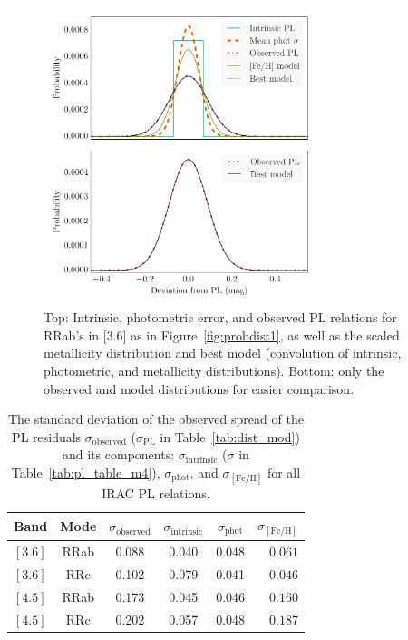 \begin{figure}
\begin{center}
\includegraphics[width=80mm]{reworked_fitting_code/final_plots/distributions_ab_3_gaussian.pdf}
\caption{Top: Intrinsic, photometric error, and observed PL relations for RRab's in [3.6] as in Figure~\ref{fig:probdist1}, as well as the scaled metallicity distribution and best model (convolution of intrinsic, photometric, and metallicity distributions). Bottom: only the observed and model distributions for easier comparison.}
\label{fig:probdist2}
\end{center}
\end{figure}

\begin{table}
\centering
\caption{The standard deviation of the observed spread of the PL residuals $\sigma_{\text{observed}}$ ($\sigma_{\text{PL}}$ in Table~\ref{tab:dist_mod}) and its components: $\sigma_{\text{intrinsic}}$ ($\sigma$ in Table~\ref{tab:pl_table_m4}), $\sigma_{\text{phot}}$, and $\sigma_{[\text{Fe/H}]}$ for all IRAC PL relations.}
\label{tab:metallicity_sigma}
\begin{tabular}{lccccr} 
\hline \hline
Band & Mode & $\sigma_{\text{observed}}$ & $\sigma_{\text{intrinsic}}$ & $\sigma_{\text{phot}}$ & $\sigma_{[\text{Fe/H}]}$ \\
\hline
$[3.6]$ & RRab & 0.088 & 0.040 & 0.048 & $0.061$ \\ %
$[3.6]$ & RRc & 0.102 & 0.079 & 0.041 & $0.046$ \\ %
$[4.5]$ & RRab & 0.173 & 0.045 & 0.046 & $0.160$ \\ %
$[4.5]$ & RRc & 0.202 & 0.057 & 0.048 & $0.187$ \\ %
\hline
\end{tabular}
\end{table}

